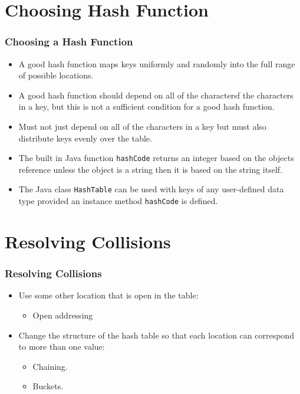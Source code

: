 \documentclass{beamer}
\begin{document}
\section{Choosing Hash Function}
\begin{frame}
\frametitle{Choosing a Hash Function}
\begin{itemize}
\item A good hash function maps keys {\color{red}uniformly} and {\color{green}randomly} into the full range of possible locations.
\item A good hash function should depend on all of the charactersf the characters in a key, but this is not a sufficient condition for a good hash function.
\item Must not just depend on all of the characters in a key but must also distribute keys evenly over the table.
\item The built in Java function \texttt{hashCode} returns an integer based on the objects {\color{blue}reference} unless the object is a string then it is based on the string itself.
\item The Java class \texttt{HashTable} can be used with keys of any user-defined data type provided an instance method \texttt{hashCode} is defined.
\end{itemize}
\end{frame}
\section{Resolving Collisions}
\begin{frame}
\frametitle{Resolving Collisions}
\begin{itemize}
\item Use some other location that is open in the table:
\begin{itemize}
\item {\color{red} Open addressing}
\end{itemize}
\item Change the structure of the hash table so that each location can correspond to more than one value:
\begin{itemize}
\item {\color{green}Chaining}.
\item {\color{purple}Buckets}.
\end{itemize}
\end{itemize}
\end{frame}
\end{document}
